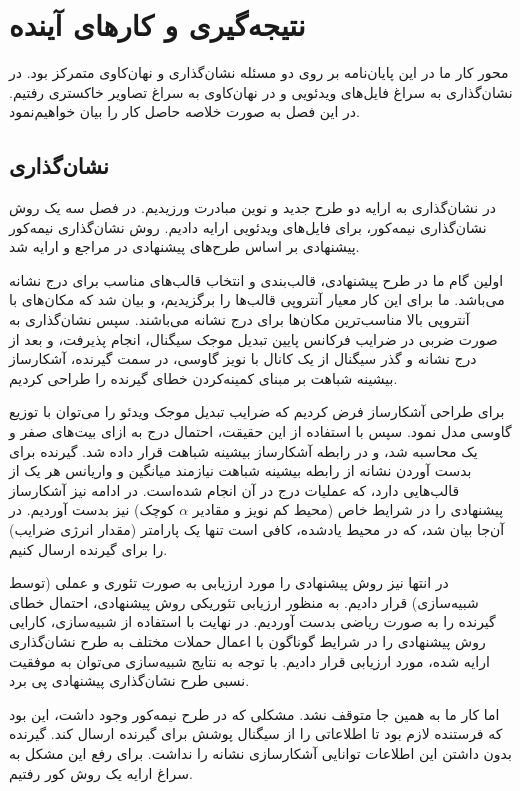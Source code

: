 \chapter{نتیجه‌گیری و کارهای آینده}
محور کار ما در این پایان‌نامه بر روی دو مسئله نشان‌گذاری و نهان‌کاوی متمرکز بود. در نشان‌گذاری به سراغ فایل‌های ویدئویی {} و در نهان‌کاوی به سراغ تصاویر خاکستری رفتیم. در این فصل به صورت خلاصه حاصل کار را بیان خواهیم‌نمود. 
\section{نشان‌گذاری}
در نشان‌گذاری به ارایه دو طرح جدید و نوین مبادرت ورزیدیم. در  فصل سه یک روش نشان‌گذاری نیمه‌کور، برای فایل‌های ویدئویی {} ارایه دادیم.  روش نشان‌گذاری نیمه‌کور پیشنهادی بر اساس طرح‌های پیشنهادی در مراجع \cite{Akhaee2010}
و \cite{Akhaee2009a}
ارایه شد. 

اولین گام ما در طرح پیشنهادی، قالب‌بندی و انتخاب قالب‌های مناسب برای درج نشانه می‌باشد. ما برای این کار معیار آنتروپی قالب‌ها را برگزیدیم، و بیان شد که مکان‌های با آنتروپی بالا مناسب‌ترین مکان‌ها برای درج نشانه می‌باشند. سپس نشان‌گذاری به صورت ضربی در ضرایب فرکانس پایین تبدیل موجک سیگنال، انجام پذیرفت، و بعد از درج نشانه و گذر سیگنال از یک کانال با نویز گاوسی، در سمت گیرنده، آشکارساز بیشینه شباهت بر مبنای کمینه‌کردن خطای گیرنده را طراحی کردیم.  

برای طراحی آشکارساز فرض کردیم که ضرایب تبدیل موجک ویدئو را می‌توان با توزیع گاوسی مدل نمود. سپس با استفاده از این حقیقت، احتمال درج به ازای بیت‌های صفر و یک محاسبه شد، و در رابطه آشکارساز بیشینه شباهت قرار داده شد. گیرنده برای بدست آوردن نشانه از رابطه بیشینه شباهت نیازمند میانگین و واریانس هر یک از قالب‌هایی دارد، که عملیات درج در آن انجام شده‌است. در ادامه نیز آشکارساز پیشنهادی را در شرایط خاص (محیط کم نویز و مقادیر {$\alpha$} کوچک) نیز بدست آوردیم. در آن‌جا بیان شد، که در محیط یادشده، کافی است تنها یک پارامتر (مقدار انرژی ضرایب) را برای گیرنده ارسال کنیم. 

در انتها نیز روش پیشنهادی را مورد ارزیابی به صورت تئوری و عملی (توسط شبیه‌سازی) قرار دادیم. 
به منظور ارزیابی تئوریکی روش پیشنهادی،  احتمال خطای گیرنده را به صورت ریاضی بدست آوردیم. در نهایت با استفاده از شبیه‌سازی، کارایی روش پیشنهادی را در شرایط گوناگون با اعمال حملات مختلف به طرح نشان‌گذاری ارایه شده، مورد ارزیابی قرار دادیم. با توجه به نتایج شبیه‌سازی می‌توان به موفقیت نسبی طرح نشان‌گذاری پیشنهادی پی برد. 

اما کار ما به همین جا متوقف نشد. مشکلی که در طرح نیمه‌کور وجود داشت، این بود که فرستنده لازم بود تا اطلاعاتی را از سیگنال پوشش برای گیرنده ارسال کند. گیرنده بدون داشتن این اطلاعات توانایی آشکارسازی نشانه را نداشت. برای رفع این مشکل به سراغ ارایه یک روش کور  رفتیم. 

